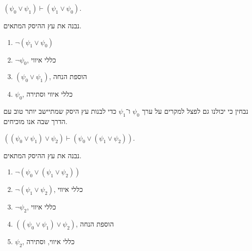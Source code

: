 \subquestion{}
$(\psi_0 \lor \psi_1) \vdash (\psi_1 \lor \psi_0)$.
\begin{solution}
	נבנה את עץ ההיסק המתאים.
	\begin{enumerate}
		\item $\lnot (\psi_1 \lor \psi_0)$
		\item $\lnot \psi_0$, כללי איווי
		\item $(\psi_0 \lor \psi_1)$, הוספת הנחה
		\item $\psi_0$, כללי איווי וסתירה
	\end{enumerate}
	נבחין כי יכולנו גם לפצל למקרים על ערך $\psi_0$ ו־$\psi_1$ כדי לבנות עץ היסק שמתיישב יותר טוב עם הדרך שבה אנו מוכיחים.
\end{solution}

\subquestion{}
$((\psi_0 \lor \psi_1) \lor \psi_2) \vdash (\psi_0 \lor (\psi_1 \lor \psi_2))$.
\begin{solution}
	נבנה את עץ ההיסק המתאים.
	\begin{enumerate}
		\item $\lnot (\psi_0 \lor (\psi_1 \lor \psi_2))$
		\item $\lnot (\psi_1 \lor \psi_2)$, כללי איווי
		\item $\lnot \psi_2$, כללי איווי
		\item $((\psi_0 \lor \psi_1) \lor \psi_2)$, הוספת הנחה
		\item $\psi_2$, כללי איווי, וסתירה
	\end{enumerate}
\end{solution}

